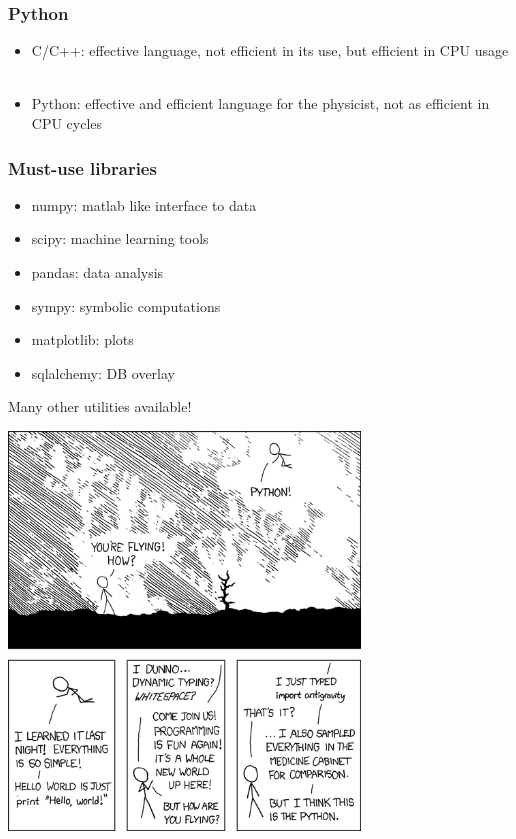 \documentclass[14pt,notes]{beamer}
\begin{document}
\begin{frame}
\frametitle{Python}
\begin{itemize}
\item C/C++: effective language, not efficient in its use, but efficient in CPU usage\\~
\item Python: effective and efficient language for the physicist, not as efficient in CPU cycles
\end{itemize}
\end{frame}

\begin{frame}
\frametitle{Must-use libraries}
\begin{itemize}
\item numpy: matlab like interface to data
\item scipy: machine learning tools
\item pandas: data analysis
\item sympy: symbolic computations
\item matplotlib: plots
\item sqlalchemy: DB overlay
\end{itemize}
Many other utilities available!
\end{frame}

\begin{frame}
\centering
\includegraphics[width=0.7\textwidth]{python}

\end{frame}
\end{document}
